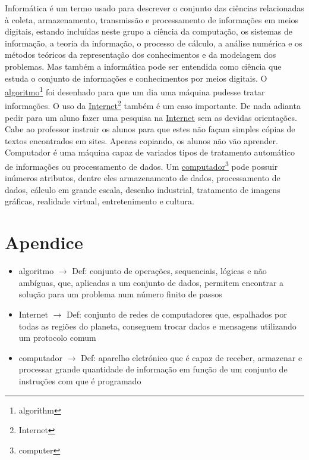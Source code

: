 \documentclass{article}
\begin{document}
Informática é um termo usado para descrever o conjunto das ciências relacionadas à coleta, armazenamento, transmissão e processamento de informações em meios digitais, estando incluídas neste grupo a ciência da computação, os sistemas de informação, a teoria da informação, o processo de cálculo, a análise numérica e os métodos teóricos da representação dos conhecimentos e da modelagem dos problemas. Mas também a informática pode ser entendida como ciência que estuda o conjunto de informações e conhecimentos por meios digitais. O \underline{algoritmo}\footnote{algorithm} foi desenhado para que um dia uma máquina pudesse tratar informações. O uso da \underline{Internet}\footnote{Internet} também é um caso importante. De nada adianta pedir para um aluno fazer uma pesquisa na \underline{Internet} sem as devidas orientações. Cabe ao professor instruir os alunos para que estes não façam simples cópias de textos encontrados em sites. Apenas copiando, os alunos não vão aprender. Computador é uma máquina capaz de variados tipos de tratamento automático de informações ou processamento de dados. Um \underline{computador}\footnote{computer} pode possuir inúmeros atributos, dentre eles armazenamento de dados, processamento de dados, cálculo em grande escala, desenho industrial, tratamento de imagens gráficas, realidade virtual, entretenimento e cultura. 
\appendix
\section{Apendice}
\begin{itemize}
\item algoritmo $\to$ Def: conjunto de operações, sequenciais, lógicas e não ambíguas, que, aplicadas a um conjunto de dados, permitem encontrar a solução para um problema num número finito de passos
\item Internet $\to$ Def: conjunto de redes de computadores que, espalhados por todas as regiões do planeta, conseguem trocar dados e mensagens utilizando um protocolo comum
\item computador $\to$ Def: aparelho eletrónico que é capaz de receber, armazenar e processar grande quantidade de informação em função de um conjunto de instruções com que é programado
\end{itemize}
\end{document}
